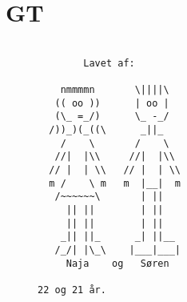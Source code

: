 \documentclass[10pt,a4paper,danish]{article}
\begin{document}
\section{GT}
\begin{figure} [htbp] 
\begin{verbatim}

        Lavet af:

    nmmmmn       \||||\
   (( oo ))      | oo |
   (\_ =_/)      \_ -_/
  /))_)(_((\      _||_
    /    \       /    \
   //|  |\\     //|  |\\
  // |  | \\   // |  | \\
  m /    \ m   m  |__|  m
   /~~~~~~\       | ||  
     || ||        | ||  
     || ||        | ||  
    _|| ||_      _| ||__
   /_/| |\_\    |___|___|
     Naja    og   Søren

22 og 21 år. 

\end{verbatim}
\end{figure}
\end{document}
